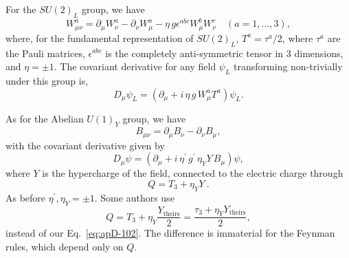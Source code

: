 \documentclass{ws-ijmpa}
\begin{document}
For the $SU(2)_L$ group, we have
%
\begin{equation}
  \label{eq:apD-94}
  W_{\mu\nu}^a = \partial_{\mu} W_\nu^a -\partial_{\nu} W_\mu^a
  -\eta\, g  \epsilon^{abc} W_\mu^b W_\nu^c \quad (a=1,\ldots, 3) ,
\end{equation}
%
where, for the fundamental representation of $SU(2)_L$,
$T^a=\tau^a/2$, where $\tau^a$ are the Pauli matrices,
$\epsilon^{abc}$ is the completely anti-symmetric
tensor in 3 dimensions,
and $\eta=\pm 1$. 
The covariant derivative for any field $\psi_L$ transforming
non-trivially under this group is,
%
\begin{equation}
  \label{eq:ApD-99}
  D_\mu \psi_L = \left( \partial_\mu + i\,\eta\, g\, W^a_\mu T^a \right) \psi_L.
\end{equation}


As for the Abelian $U(1)_Y$ group,
we have
%
\begin{equation}
  \label{eq:apD-100}
  B_{\mu\nu} = \partial_{\mu} B_\nu -\partial_{\nu} B_\mu,
\end{equation}
%
with the covariant derivative given by
%
\begin{equation}
  \label{eq:apD-101}
  D_\mu \psi = \left( \partial_\mu +i\,\eta^\prime\, g^\prime\, \eta_Y Y\, B_\mu  \right) \psi,
\end{equation}
%
where $Y$ is the hypercharge of the field,
connected to the electric charge through
%
\begin{equation}
\label{eq:apD-102}
  Q = T_3 + \eta_YY\ .
\end{equation}
%
As before $\eta^\prime, \eta_Y = \pm 1$.
Some authors use
%
\begin{equation}
\label{eq:apD-102-theirs}
  Q = T_3 + \eta_Y \frac{Y_\textrm{theirs}}{2} = \frac{\tau_3 +\eta_Y
    Y_\textrm{theirs}}{2}, 
\end{equation}
%
instead of our Eq.~\eqref{eq:apD-102}.
The difference is immaterial for the Feynman rules,
which depend only on $Q$.
\end{document}
